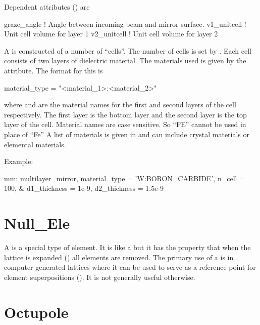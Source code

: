 {
Dependent attributes () are
\begin{example}
  graze_angle      ! Angle between incoming beam and mirror surface.
  v1_unitcell      ! Unit cell volume for layer 1
  v2_unitcell      ! Unit cell volume for layer 2 
\end{example}

A  is constructed of a number of ``cells''. The
number of cells is set by . Each cell consists of two
layers of dielectric material. The materials used is given by
the  attribute. The format for this is
\begin{example}
  material_type = "<material_1>:<material_2>"
\end{example}
where  and  are the material names
for the first and second layers of the cell respectively. The first
layer is the bottom layer and the second layer is the top layer of the
cell.  Material names are case sensitive. So ``FE'' cannot be used in
place of ``Fe'' A list of materials is given in 
and can include crystal materials or elemental materials.

Example:
\begin{example}
  mm: multilayer_mirror, material_type = 'W:BORON_CARBIDE', n_cell = 100, &
            d1_thickness = 1e-9, d2_thickness = 1.5e-9
\end{example}

\section{Null_Ele}
\label{s:null.ele}

A  is a special type of element. It is like a 
but it has the property that when the lattice is expanded
() all  elements are removed. The
primary use of a  is in computer generated lattices where
it can be used to serve as a reference point for element
superpositions (). It is not generally useful otherwise.

\section{Octupole}
\label{s:oct}

}
